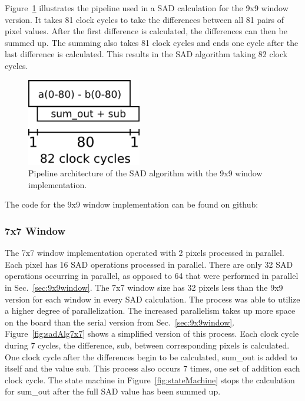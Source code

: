 Figure~\ref{fig:sadPipe9x9} illustrates the pipeline used in a SAD calculation for the 9x9 window version. It takes 81 clock cycles to take the differences between all 81 pairs of pixel values. After the first difference is calculated, the differences can then be summed up. The summing also takes 81 clock cycles and ends one cycle after the last difference is calculated. This results in the SAD algorithm taking 82 clock cycles.

\begin{figure}
	\begin{center}
		\includegraphics[width=50mm]{figures/sadPipeline9x9.png}
		\captionfonts
		\caption{Pipeline architecture of the SAD algorithm with the 9x9 window implementation.}
		\label{fig:sadPipe9x9}
	\end{center}
\end{figure}

The code for the 9x9 window implementation can be found on github:
\\

\subsubsection{7x7 Window}
\label{sec:7x7window}

The 7x7 window implementation operated with 2 pixels processed in parallel. Each pixel has 16 SAD operations processed in parallel. There are only 32 SAD operations occurring in parallel, as opposed to 64 that were performed in parallel in Sec.~\ref{sec:9x9window}. The 7x7 window size has 32 pixels less than the 9x9 version for each window in every SAD calculation. The process was able to utilize a higher degree of parallelization. The increased parallelism takes up more space on the board than the serial version from Sec.~\ref{sec:9x9window}. Figure~\ref{fig:sadAlg7x7} shows a simplified version of this process. Each clock cycle during 7 cycles, the difference, sub, between corresponding pixels is calculated. One clock cycle after the differences begin to be calculated, sum\_out is added to itself and the value sub. This process also occurs 7 times, one set of addition each clock cycle. The state machine in Figure~\ref{fig:stateMachine} stops the calculation for sum\_out after the full SAD value has been summed up.

